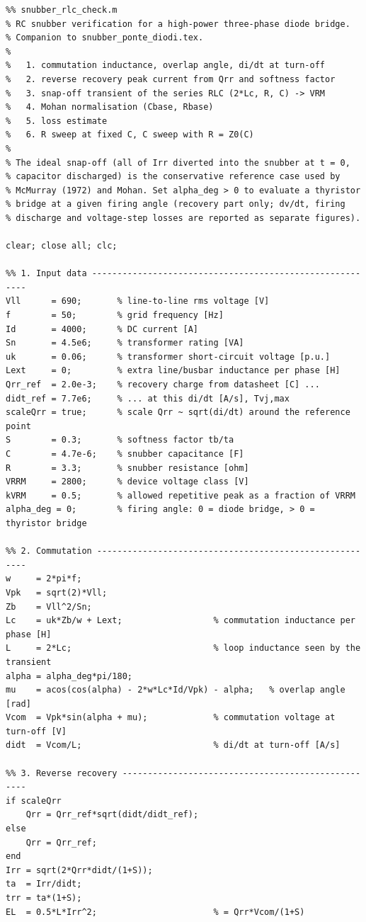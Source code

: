 \documentclass[11pt,a4paper]{article}
\begin{document}
\begin{lstlisting}
%% snubber_rlc_check.m
% RC snubber verification for a high-power three-phase diode bridge.
% Companion to snubber_ponte_diodi.tex.
%
%   1. commutation inductance, overlap angle, di/dt at turn-off
%   2. reverse recovery peak current from Qrr and softness factor
%   3. snap-off transient of the series RLC (2*Lc, R, C) -> VRM
%   4. Mohan normalisation (Cbase, Rbase)
%   5. loss estimate
%   6. R sweep at fixed C, C sweep with R = Z0(C)
%
% The ideal snap-off (all of Irr diverted into the snubber at t = 0,
% capacitor discharged) is the conservative reference case used by
% McMurray (1972) and Mohan. Set alpha_deg > 0 to evaluate a thyristor
% bridge at a given firing angle (recovery part only; dv/dt, firing
% discharge and voltage-step losses are reported as separate figures).

clear; close all; clc;

%% 1. Input data ---------------------------------------------------------
Vll      = 690;       % line-to-line rms voltage [V]
f        = 50;        % grid frequency [Hz]
Id       = 4000;      % DC current [A]
Sn       = 4.5e6;     % transformer rating [VA]
uk       = 0.06;      % transformer short-circuit voltage [p.u.]
Lext     = 0;         % extra line/busbar inductance per phase [H]
Qrr_ref  = 2.0e-3;    % recovery charge from datasheet [C] ...
didt_ref = 7.7e6;     % ... at this di/dt [A/s], Tvj,max
scaleQrr = true;      % scale Qrr ~ sqrt(di/dt) around the reference point
S        = 0.3;       % softness factor tb/ta
C        = 4.7e-6;    % snubber capacitance [F]
R        = 3.3;       % snubber resistance [ohm]
VRRM     = 2800;      % device voltage class [V]
kVRM     = 0.5;       % allowed repetitive peak as a fraction of VRRM
alpha_deg = 0;        % firing angle: 0 = diode bridge, > 0 = thyristor bridge

%% 2. Commutation --------------------------------------------------------
w     = 2*pi*f;
Vpk   = sqrt(2)*Vll;
Zb    = Vll^2/Sn;
Lc    = uk*Zb/w + Lext;                  % commutation inductance per phase [H]
L     = 2*Lc;                            % loop inductance seen by the transient
alpha = alpha_deg*pi/180;
mu    = acos(cos(alpha) - 2*w*Lc*Id/Vpk) - alpha;   % overlap angle [rad]
Vcom  = Vpk*sin(alpha + mu);             % commutation voltage at turn-off [V]
didt  = Vcom/L;                          % di/dt at turn-off [A/s]

%% 3. Reverse recovery ---------------------------------------------------
if scaleQrr
    Qrr = Qrr_ref*sqrt(didt/didt_ref);
else
    Qrr = Qrr_ref;
end
Irr = sqrt(2*Qrr*didt/(1+S));
ta  = Irr/didt;
trr = ta*(1+S);
EL  = 0.5*L*Irr^2;                       % = Qrr*Vcom/(1+S)


\end{lstlisting}
\end{document}
